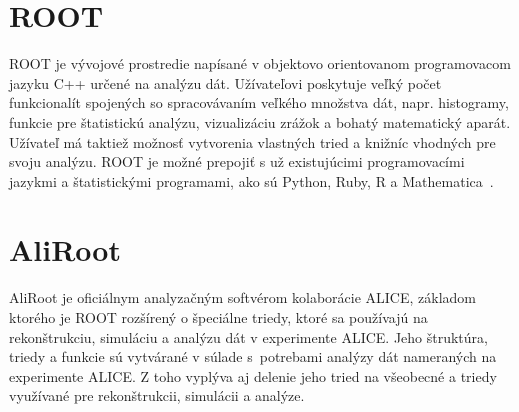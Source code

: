 \documentclass[thesismargins, thesislinespacing]{rnthesis}
\begin{document}


\section{ROOT}
ROOT je vývojové prostredie napísané v objektovo orientovanom programovacom jazyku C++ určené na analýzu dát. Užívateľovi poskytuje veľký počet funkcionalít spojených so spracovávaním veľkého množstva dát, napr. histogramy, funkcie pre štatistickú analýzu, vizualizáciu zrážok a bohatý matematický aparát. Užívateľ má taktiež možnosť vytvorenia vlastných tried a knižníc vhodných pre svoju analýzu. ROOT je možné prepojiť s už existujúcimi programovacími jazykmi a štatistickými programami, ako sú Python, Ruby, R a Mathematica~\cite{root}.

\section{AliRoot}
AliRoot je oficiálnym analyzačným softvérom kolaborácie ALICE, základom ktorého je ROOT rozšírený o špeciálne triedy, ktoré sa používajú na rekonštrukciu, simuláciu a analýzu dát v experimente ALICE. Jeho štruktúra, triedy a funkcie sú vytvárané v súlade s~potrebami analýzy dát nameraných na experimente ALICE. Z toho vyplýva aj delenie jeho tried na všeobecné a triedy využívané pre rekonštrukcii, simulácii a analýze. 
\end{document}
